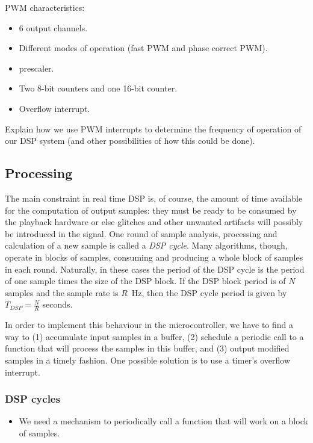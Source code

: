 PWM characteristics:

\begin{itemize}
    \item 6 output channels.
    \item Different modes of operation (fast PWM and phase correct PWM).
    \item prescaler.
    \item Two 8-bit counters and one 16-bit counter.
    \item Overflow interrupt.
\end{itemize}


Explain how we use PWM interrupts to determine the frequency of operation of
our DSP system (and other possibilities of how this could be done).


\subsection{Processing}

The main constraint in real time DSP is, of course, the amount of time
available for the computation of output samples: they must be ready to be
consumed by the playback hardware or else glitches and other unwanted
artifacts will possibly be introduced in the signal. One round of sample
analysis, processing and calculation of a new sample is called a \emph{DSP
cycle}. Many algorithms, though, operate in blocks of samples, consuming and
producing a whole block of samples in each round. Naturally, in these cases
the period of the DSP cycle is the period of one sample times the size of the
DSP block. If the DSP block period is of $N$ samples and the sample rate is
$R$~Hz, then the DSP cycle period is given by $T_{DSP}=\frac{N}{R}$ seconds.

In order to implement this behaviour in the microcontroller, we have to find a
way to (1) accumulate input samples in a buffer, (2) schedule a periodic call
to a function that will process the samples in this buffer, and (3) output
modified samples in a timely fashion. One possible solution is to use a
timer's overflow interrupt.

\subsubsection{DSP cycles}

\begin{itemize}
    \item We need a mechanism to periodically call a function that will work
    on a block of samples.
\end{itemize}

